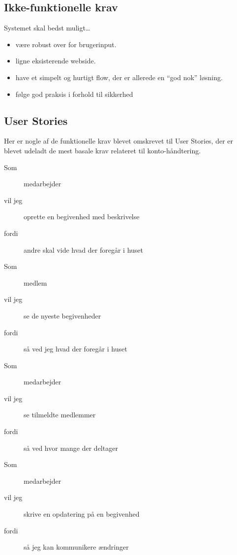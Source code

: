 \documentclass[../main]{subfiles}
\begin{document}
    \subsection{Ikke-funktionelle krav}
        Systemet skal bedst muligt\dots
        \begin{itemize}
            \item være robust over for brugerinput.
            \item ligne eksisterende webside.
            \item have et simpelt og hurtigt flow, der er allerede en \enquote{god nok} løsning.
            \item følge god praksis i forhold til sikkerhed
        \end{itemize}


    \subsection{User Stories}
        Her er nogle af de funktionelle krav blevet omskrevet til User Stories, der er blevet udeladt de mest basale krav relateret til konto-håndtering.

        \begin{description}
            \item[Som] medarbejder
            \item[vil jeg] oprette en begivenhed med beskrivelse
            \item[fordi] andre skal vide hvad der foregår i huset
        \end{description}

        \begin{description}
            \item[Som] medlem
            \item[vil jeg] se de nyeste begivenheder
            \item[fordi] så ved jeg hvad der foregår i huset 
        \end{description}

        \begin{description}
            \item[Som] medarbejder
            \item[vil jeg] se tilmeldte medlemmer
            \item[fordi] så ved hvor mange der deltager
        \end{description}

        \begin{description}
            \item[Som] medarbejder
            \item[vil jeg] skrive en opdatering på en begivenhed
            \item[fordi] så jeg kan kommunikere ændringer
        \end{description}
\end{document}
